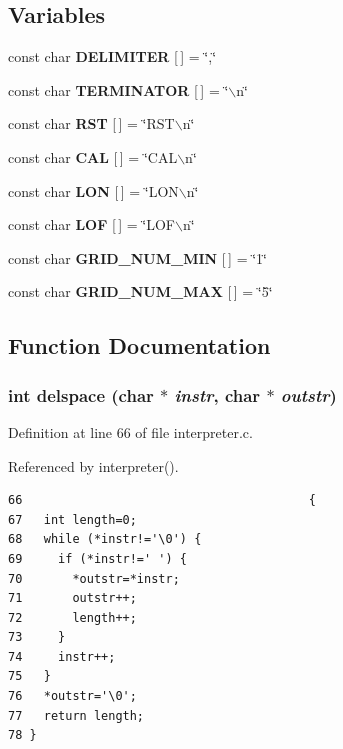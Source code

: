 \subsection*{Variables}
\begin{CompactItemize}
\item 
const char {\bf DELIMITER} [$\,$] = \char`\"{},\char`\"{}
\item 
const char {\bf TERMINATOR} [$\,$] = \char`\"{}$\backslash$n\char`\"{}
\item 
const char {\bf RST} [$\,$] = \char`\"{}RST$\backslash$n\char`\"{}
\item 
const char {\bf CAL} [$\,$] = \char`\"{}CAL$\backslash$n\char`\"{}
\item 
const char {\bf LON} [$\,$] = \char`\"{}LON$\backslash$n\char`\"{}
\item 
const char {\bf LOF} [$\,$] = \char`\"{}LOF$\backslash$n\char`\"{}
\item 
const char {\bf GRID\_\-NUM\_\-MIN} [$\,$] = \char`\"{}1\char`\"{}
\item 
const char {\bf GRID\_\-NUM\_\-MAX} [$\,$] = \char`\"{}5\char`\"{}
\end{CompactItemize}


\subsection{Function Documentation}
\subsubsection{\setlength{\rightskip}{0pt plus 5cm}int delspace (char $\ast$ {\em instr}, char $\ast$ {\em outstr})}\label{interpreter_8c_a8}




Definition at line 66 of file interpreter.c.

Referenced by interpreter().

\footnotesize\begin{verbatim}66                                        {
67   int length=0;
68   while (*instr!='\0') {
69     if (*instr!=' ') {
70       *outstr=*instr;
71       outstr++;
72       length++;
73     }
74     instr++;
75   }
76   *outstr='\0';
77   return length;
78 }
\end{verbatim}\normalsize 


